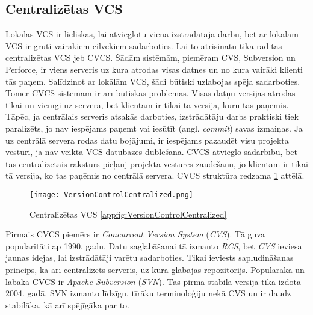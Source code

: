 \subsection{Centralizētas VCS}
Lokālas VCS ir lieliskas, lai atvieglotu viena izstrādātāja darbu, bet ar lokālām VCS ir grūti vairākiem cilvēkiem sadarboties. Lai to atrisinātu tika radītas centralizētas VCS jeb CVCS. Šādām sistēmām, piemēram CVS, Subversion un Perforce, ir viens serveris uz kura atrodas visas datnes un no kura vairāki klienti tās paņem. Salīdzinot ar lokālām VCS, šādi būtiski uzlabojas spēja sadarboties. Tomēr CVCS sistēmām ir arī būtiskas problēmas. Visas datņu versijas atrodas tikai un vienīgi uz servera, bet klientam ir tikai tā versija, kuru tas paņēmis. Tāpēc, ja centrālais serveris atsakās darboties, izstrādātāju darbs praktiski tiek paralizēts, jo nav iespējams paņemt vai iesūtīt (angl. \textit{commit}) savas izmaiņas. Ja uz centrālā servera rodas datu bojājumi, ir iespējams pazaudēt visu projekta vēsturi, ja nav veikta VCS datubāzes dublēšana.
CVCS atvieglo sadarbību, bet tās centralizētais raksturs pieļauj projekta vēstures zaudēšanu, jo klientam ir tikai tā versija, ko tas paņēmis no centrālā servera. CVCS struktūra redzama \ref{fig:VersionControlCentralized} attēlā. \cite[CVCS]{chacon2014progit}
\begin{figure}[H]%
	\centering
	\captionsetup{justification=centering}
	\texttt{[image: VersionControlCentralized.png]}
	\caption{Centralizētas VCS \ref{appfig:VersionControlCentralized}}
	\label{fig:VersionControlCentralized}
\end{figure}
Pirmais CVCS piemērs ir \textit{Concurrent Version System} (\textit{CVS}). Tā guva popularitāti ap 1990. gadu. Datu saglabāšanai tā izmanto \textit{RCS}, bet \textit{CVS} ieviesa jaunas idejas, lai izstrādātāji varētu sadarboties. Tikai ieviests sapludināšanas princips, kā arī centralizēts serveris, uz kura glabājas repozitorijs.
Populārākā un labākā CVCS ir \textit{Apache Subversion} (\textit{SVN}). Tās pirmā stabilā versija tika izdota 2004. gadā. SVN izmanto līdzīgu, tīrāku terminoloģiju nekā CVS un ir daudz stabilāka, kā arī spējīgāka par to.
\cite[SVN]{raymondVCS}

